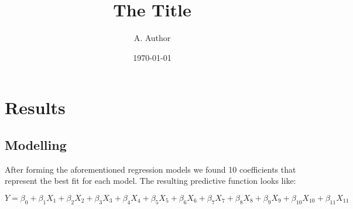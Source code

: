 \documentclass{article}
\begin{document}

\title{The Title}
\maketitle

\author{A. Author}
\date{\today}

\section{Results}

\subsection{Modelling}
After forming the aforementioned regression models we found 10 coefficients that represent the best fit for each model. The resulting predictive function looks like:

\begin{equation}
Y = \beta_0 + \beta_1 X_1 + \beta_2 X_2 + \beta_3 X_3 + \beta_4 X_4 + \beta_5 X_5 + \beta_6 X_6 + \beta_7 X_7 + \beta_8 X_8 + \beta_9 X_9 + \beta_{10} X_{10} + \beta_{11} X_{11}
\end{equation}
\end{document}
